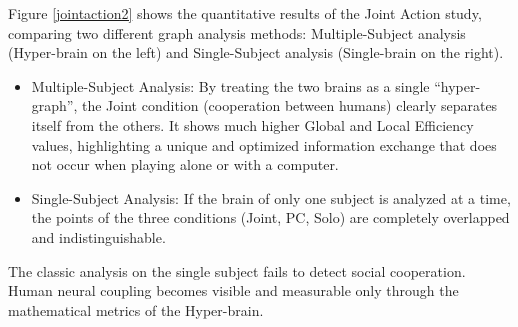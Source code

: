 \documentclass[10pt, letterpaper]{report}
\begin{document}
Figure \ref{jointaction2} shows the quantitative results of the Joint Action study, comparing two different graph analysis methods: Multiple-Subject analysis (Hyper-brain on the left) and Single-Subject analysis (Single-brain on the right).\begin{itemize}
     \item Multiple-Subject Analysis: By treating the two brains as a single ``hyper-graph'', the Joint condition (cooperation between humans) clearly separates itself from the others. It shows much higher Global and Local Efficiency values, highlighting a unique and optimized information exchange that does not occur when playing alone or with a computer.
     \item Single-Subject Analysis: If the brain of only one subject is analyzed at a time, the points of the three conditions (Joint, PC, Solo) are completely overlapped and indistinguishable.
\end{itemize}
The classic analysis on the single subject fails to detect social cooperation. Human neural coupling becomes visible and measurable only through the mathematical metrics of the Hyper-brain.\bigskip
\end{document}
